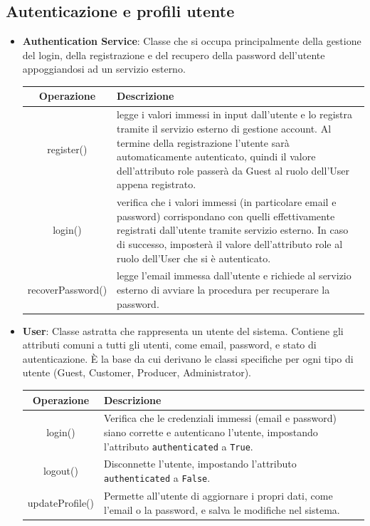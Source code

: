 \subsection{Autenticazione e profili utente}
\begin{itemize}
    \item \textbf{Authentication Service}:
Classe che si occupa principalmente della gestione del login, della registrazione e del recupero della password dell’utente appoggiandosi ad un servizio esterno.
\begin{table}[!htbp]
    \centering
    \begin{tabularx}{\textwidth}{| c | X |}
    \hline
         \textbf{Operazione} & \textbf{Descrizione}\\
         \hline
         register() & legge i valori immessi in input dall’utente e lo registra tramite il servizio esterno di gestione account. Al termine della registrazione l’utente sarà automaticamente autenticato, quindi il valore dell’attributo role passerà da Guest al ruolo dell'User appena registrato.\\
         \hline
         login() & verifica che i valori immessi (in particolare email e password) corrispondano con quelli effettivamente registrati dall’utente tramite servizio esterno. In caso di successo, imposterà il valore dell’attributo role al ruolo dell'User che si è autenticato.\\
         \hline
         recoverPassword() & legge l’email immessa dall’utente e richiede al servizio esterno di avviare la procedura per recuperare la password.\\
         \hline
    \end{tabularx}
\end{table}

\item \textbf{User}: Classe astratta che rappresenta un utente del sistema. Contiene gli attributi comuni a tutti gli utenti, come email, password, e stato di autenticazione. È la base da cui derivano le classi specifiche per ogni tipo di utente (Guest, Customer, Producer, Administrator). 
\begin{table}[!htbp] 
    \centering 
    \begin{tabularx}{\textwidth}{| c | X |} 
    \hline 
    \textbf{Operazione} & \textbf{Descrizione}\\
    \hline 
    login() & Verifica che le credenziali immessi (email e password) siano corrette e autenticano l'utente, impostando l'attributo \texttt{authenticated} a \texttt{True}.\\ 
    \hline 
    logout() & Disconnette l'utente, impostando l'attributo \texttt{authenticated} a \texttt{False}.\\
    \hline 
    updateProfile() & Permette all'utente di aggiornare i propri dati, come l'email o la password, e salva le modifiche nel sistema.\\
    \hline 
    \end{tabularx} 
\end{table} 


\end{itemize}
